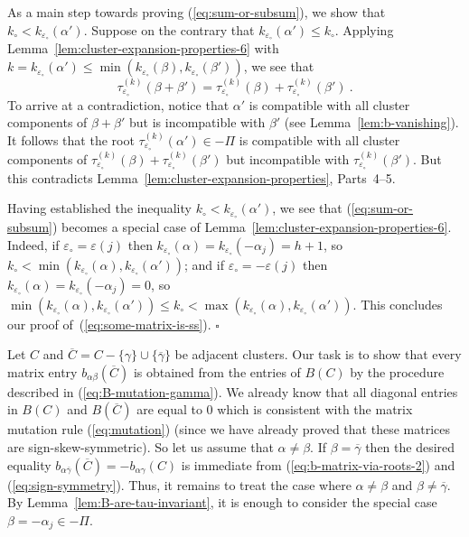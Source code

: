\documentclass[letterpaper]{amsart}
\numberwithin{equation}{section}
\theoremstyle{definition}
\newcommand{\credit}[1]{\smallskip\noindent {\textbf{#1.\ }}}
\def\endproof{\hfill$\square$\medskip}
\begin{document}
As a main step towards proving (\ref{eq:sum-or-subsum}), we show that 
$k_\circ \!<\! k_{\varepsilon_\circ} (\alpha')$. 
Suppose on the contrary that 
$k_{\varepsilon_\circ} (\alpha')\! \leq\! k_\circ$. 
Applying Lemma~\ref{lem:cluster-expansion-properties-6} with 
$k = k_{\varepsilon_\circ} (\alpha') \leq 
\min(k_{\varepsilon_\circ} (\beta),k_{\varepsilon_\circ}(\beta'))$, 
we see that 
$$\tau^{(k)}_{\varepsilon_\circ} (\beta+\beta') = 
\tau^{(k)}_{\varepsilon_\circ} (\beta)+\tau^{(k)}_{\varepsilon_\circ} (\beta')\ .$$ 
To arrive at a contradiction, notice that $\alpha'$ is compatible 
with all cluster components of $\beta + \beta'$ but is 
incompatible with $\beta'$ (see Lemma~\ref{lem:b-vanishing}). 
It follows that the root 
$\tau^{(k)}_{\varepsilon_\circ} (\alpha') \in - \Pi$ is compatible 
with all cluster components of 
$\tau^{(k)}_{\varepsilon_\circ} (\beta)+\tau^{(k)}_{\varepsilon_\circ}(\beta')$ 
but incompatible with $\tau^{(k)}_{\varepsilon_\circ} (\beta')$. 
But this contradicts Lemma~\ref{lem:cluster-expansion-properties}, Parts~4--5. 
 
Having established the inequality $k_\circ < k_{\varepsilon_\circ}(\alpha')$, 
we see that (\ref{eq:sum-or-subsum}) becomes a special case of 
Lemma~\ref{lem:cluster-expansion-properties-6}. 
Indeed, if $\varepsilon_\circ = \varepsilon(j)$ then 
$k_{\varepsilon_\circ}(\alpha) = k_{\varepsilon_\circ}(-\alpha_j) = h+1$, 
so  $k_\circ < \min(k_{\varepsilon_\circ}(\alpha), k_{\varepsilon_\circ}(\alpha'))$; 
and if $\varepsilon_\circ = -\varepsilon(j)$ then 
$k_{\varepsilon_\circ}(\alpha) = k_{\varepsilon_\circ}(-\alpha_j) = 0$, 
so  $\min(k_{\varepsilon_\circ}(\alpha), k_{\varepsilon_\circ}(\alpha')) 
\!\leq\! k_\circ \!<\! \max(k_{\varepsilon_\circ}(\alpha), 
k_{\varepsilon_\circ}(\alpha'))$. 
This concludes our proof of~(\ref{eq:some-matrix-is-ss}). 
\endproof 
 
\credit{Proof of {\rm(\ref{eq:B-mutation-gamma})}} 
Let $C$ and $\overline C = C-\{\gamma\}\cup\{\overline\gamma\}$ be 
adjacent clusters. 
Our task is to show that every matrix entry 
$b_{\alpha \beta}(\overline C)$ is obtained from the entries of 
$B(C)$ by the procedure described in (\ref{eq:B-mutation-gamma}). 
We already know that all diagonal entries in $B(C)$ and 
$B(\overline C)$ are equal to $0$ which is consistent with the 
matrix mutation rule (\ref{eq:mutation}) (since we have already proved 
that these matrices are sign-skew-symmetric). 
So let us assume that $\alpha \neq \beta$. 
If $\beta = \overline \gamma$ then the desired equality 
$b_{\alpha \overline \gamma}(\overline C) = - b_{\alpha \gamma}(C)$ 
is immediate from (\ref{eq:b-matrix-via-roots-2}) 
and (\ref{eq:sign-symmetry}). 
Thus, it remains to treat the case where $\alpha \neq \beta$ and 
$\beta \neq \overline \gamma$. 
By Lemma~\ref{lem:B-are-tau-invariant}, 
it is enough to consider the special case $\beta=-\alpha_j\in-\Pi$. 
 
\end{document}
